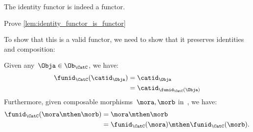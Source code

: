 \begin{lemma}
    \label{lem:identity_functor_is_functor}
    The identity functor is indeed a functor.
\end{lemma}

\begin{exercise}
    Prove \cref{lem:identity_functor_is_functor}
\end{exercise}
\begin{solution}
    To show that this is a valid functor, we need to show that it preserves identities and composition:
    \begin{compactitem}
        \item Given any~$\Obja \in \Ob_\CatC$, we have:
              \begin{equation*}
                  \begin{aligned}
                      \funid_{\CatC}(\catid_\Obja) & =\catid_\Obja                   \\
                                                   & =\catid_{\funid_{\CatC}(\Obja)}
                  \end{aligned}
              \end{equation*}
              Furthermore, given composable morphisms~$\mora,\morb$ in~\CatC, we have:
              \begin{equation*}
                  \begin{aligned}
                      \funid_{\CatC}(\mora\mthen\morb) & =\mora\mthen\morb                                    \\
                                                       & =\funid_{\CatC}(\mora)\mthen \funid_{\CatC} (\morb).
                  \end{aligned}
              \end{equation*}
    \end{compactitem}
\end{solution}
